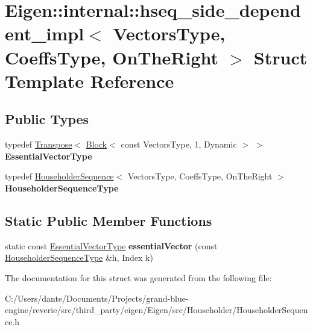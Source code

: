 \hypertarget{struct_eigen_1_1internal_1_1hseq__side__dependent__impl_3_01_vectors_type_00_01_coeffs_type_00_01_on_the_right_01_4}{}\section{Eigen\+::internal\+::hseq\+\_\+side\+\_\+dependent\+\_\+impl$<$ Vectors\+Type, Coeffs\+Type, On\+The\+Right $>$ Struct Template Reference}
\label{struct_eigen_1_1internal_1_1hseq__side__dependent__impl_3_01_vectors_type_00_01_coeffs_type_00_01_on_the_right_01_4}
\subsection*{Public Types}
\begin{DoxyCompactItemize}
\item 
\mbox{\label{struct_eigen_1_1internal_1_1hseq__side__dependent__impl_3_01_vectors_type_00_01_coeffs_type_00_01_on_the_right_01_4_a2743c3446c85d18c93e50d6bf8dc9c90}} 
typedef \mbox{\hyperlink{class_eigen_1_1_transpose}{Transpose}}$<$ \mbox{\hyperlink{class_eigen_1_1_block}{Block}}$<$ const Vectors\+Type, 1, Dynamic $>$ $>$ {\bfseries Essential\+Vector\+Type}
\item 
\mbox{\label{struct_eigen_1_1internal_1_1hseq__side__dependent__impl_3_01_vectors_type_00_01_coeffs_type_00_01_on_the_right_01_4_a7367a28ce0871b0a6d9d622a6390c0aa}} 
typedef \mbox{\hyperlink{class_eigen_1_1_householder_sequence}{Householder\+Sequence}}$<$ Vectors\+Type, Coeffs\+Type, On\+The\+Right $>$ {\bfseries Householder\+Sequence\+Type}
\end{DoxyCompactItemize}
\subsection*{Static Public Member Functions}
\begin{DoxyCompactItemize}
\item 
\mbox{\label{struct_eigen_1_1internal_1_1hseq__side__dependent__impl_3_01_vectors_type_00_01_coeffs_type_00_01_on_the_right_01_4_a464ddba84e35f766852036591374c8ec}} 
static const \mbox{\hyperlink{class_eigen_1_1_transpose}{Essential\+Vector\+Type}} {\bfseries essential\+Vector} (const \mbox{\hyperlink{class_eigen_1_1_householder_sequence}{Householder\+Sequence\+Type}} \&h, Index k)
\end{DoxyCompactItemize}


The documentation for this struct was generated from the following file\+:\begin{DoxyCompactItemize}
\item 
C\+:/\+Users/dante/\+Documents/\+Projects/grand-\/blue-\/engine/reverie/src/third\+\_\+party/eigen/\+Eigen/src/\+Householder/Householder\+Sequence.\+h\end{DoxyCompactItemize}
